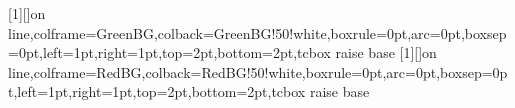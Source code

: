 
\newlength{\imagewidth}
\newlength{\imagescale}

\linespread{1.2}
\linenumbers


\newtcbox{\greenhighlight}[1][]{on line,colframe=GreenBG,colback=GreenBG!50!white,boxrule=0pt,arc=0pt,boxsep=0pt,left=1pt,right=1pt,top=2pt,bottom=2pt,tcbox raise base}
\newtcbox{\redhighlight}[1][]{on line,colframe=RedBG,colback=RedBG!50!white,boxrule=0pt,arc=0pt,boxsep=0pt,left=1pt,right=1pt,top=2pt,bottom=2pt,tcbox raise base}

\newcommand{\REDSTARTS}{\color{red}}
\newcommand{\REDENDS}{\color{black}}
\newcommand{\GREENSTARTS}{\color{green}}
\newcommand{\GREENENDS}{\color{black}}

\newread\wordcount
\newcommand\readwordcount[1]{%
\openin\wordcount=#1
\read\wordcount to \thewordcount
\closein\wordcount
\thewordcount
}

\usepackage{soul}

\usepackage{refcount}

\let\oldref\ref
\newcommand{\hlref}[1]{%
  \ifnum\getrefnumber{#1}=0
    \colorbox{yellow}{\ref*{#1}}%
  \else
    \ref{#1}%
  \fi
}

\newcommand*\sref[1]{S\hlref{#1}}
\newcommand*\sfref[1]{Supplementary Figure S\hlref{#1}}
\newcommand*\stref[1]{Supplementary Table S\hlref{#1}}
\newcommand*\smref[1]{Supplementary Materials S\hlref{#1}}

